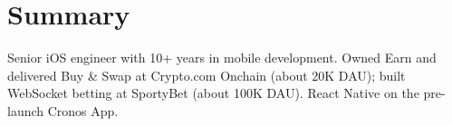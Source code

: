 \section{Summary}
Senior iOS engineer with 10+ years in mobile development. Owned Earn and delivered Buy \& Swap at Crypto.com Onchain (about 20K DAU); built WebSocket betting at SportyBet (about 100K DAU). React Native on the pre-launch Cronos App.
